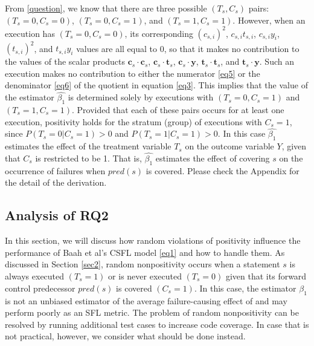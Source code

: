 From \ref{question}, we know that there are three possible $(T_s,C_s)$ pairs:
$(T_s=0,C_s=0)$, $(T_s=0,C_s=1)$, and $(T_s=1,C_s=1)$.  
However, when an execution has $(T_s=0,C_s=0)$, its corresponding $(c_{s,i})^2$, 
$c_{s,i}t_{s,i}$, $c_{s,i}y_i$, $(t_{s,i})^2$, and $t_{s,i}y_i$ values are all equal to 0, 
so that it makes no contribution to the values of the scalar products $\mathbf{c}_s\cdot\mathbf{c}_s$,
$\mathbf{c}_s\cdot\mathbf{t}_s$, $\mathbf{c}_s\cdot\mathbf{y}$, $\mathbf{t}_s\cdot\mathbf{t}_s$, 
and $\mathbf{t}_s\cdot\mathbf{y}$.  Such an execution makes no contribution to either the numerator \eqref{eq5} or the denominator \eqref{eq6} of the quotient in equation \eqref{eq3}.  
This implies that the value of the estimator $\hat{\beta_1}$ is determined solely by executions with
$(T_s=0,C_s=1)$ and $(T_s=1,C_s=1)$.  Provided that each of these pairs occurs for at least one execution, 
positivity holds for the stratum (group) of executions with $C_s=1$, since 
$P(T_s=0|C_s=1)>0$ and $P(T_s=1|C_s=1)>0$.  In this case $\hat{\beta_1}$ estimates the effect of the 
treatment variable $T_s$ on the outcome variable $Y$, given that $C_s$ is restricted to be 1.  
That is, $\hat{\beta_1}$ estimates the effect of covering $s$ on the occurrence of failures 
when $pred(s)$ is covered. Please check the Appendix for the detail of the derivation.


\subsection{Analysis of RQ2}\label{sec3.2}

In this section, we will discuss how random violations of positivity influence the performance of 
Baah et al’s CSFL model \eqref{eq1} and how to handle them.  As discussed in Section \ref{sec2}, 
random nonpositivity occurs when a statement $s$ is always executed $(T_s=1)$ or is never 
executed $(T_s=0)$ given that its forward control predecessor $pred(s)$ is covered $(C_s=1)$.  
In this case, the estimator $\hat{\beta_1}$ is not an unbiased estimator of the average 
failure-causing effect of  and may perform poorly as an SFL metric.  
The problem of random nonpositivity can be resolved by running additional test cases to increase code coverage.   
In case that is not practical, however, we consider what should be done instead.

